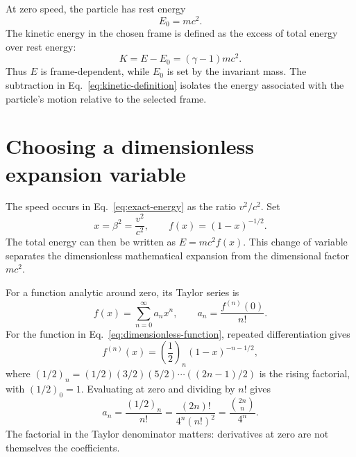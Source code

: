 \documentclass[12pt]{article}
\begin{document}
At zero speed, the particle has rest energy
\begin{equation}
  E_0=mc^2.
  \label{eq:rest-energy}
\end{equation}
The kinetic energy in the chosen frame is defined as the excess of total energy over rest energy:
\begin{equation}
  K=E-E_0=(\gamma-1)mc^2.
  \label{eq:kinetic-definition}
\end{equation}
Thus $E$ is frame-dependent, while $E_0$ is set by the invariant mass. The subtraction in Eq.~\eqref{eq:kinetic-definition} isolates the energy associated with the particle's motion relative to the selected frame.

\section{Choosing a dimensionless expansion variable}

The speed occurs in Eq.~\eqref{eq:exact-energy} as the ratio $v^2/c^2$. Set
\begin{equation}
  x=\beta^2=\frac{v^2}{c^2},
  \qquad
  f(x)=(1-x)^{-1/2}.
  \label{eq:dimensionless-function}
\end{equation}
The total energy can then be written as $E=mc^2f(x)$. This change of variable separates the dimensionless mathematical expansion from the dimensional factor $mc^2$.

For a function analytic around zero, its Taylor series is
\begin{equation}
  f(x)=\sum_{n=0}^{\infty}a_nx^n,
  \qquad
  a_n=\frac{f^{(n)}(0)}{n!}.
  \label{eq:taylor-definition}
\end{equation}
For the function in Eq.~\eqref{eq:dimensionless-function}, repeated differentiation gives
\begin{equation}
  f^{(n)}(x)=\left(\frac{1}{2}\right)_n(1-x)^{-n-1/2},
  \label{eq:binomial-derivative}
\end{equation}
where $(1/2)_n=(1/2)(3/2)(5/2)\cdots((2n-1)/2)$ is the rising factorial, with $(1/2)_0=1$. Evaluating at zero and dividing by $n!$ gives
\begin{equation}
  a_n=\frac{(1/2)_n}{n!}
     =\frac{(2n)!}{4^n(n!)^2}
     =\frac{\binom{2n}{n}}{4^n}.
  \label{eq:general-coefficient}
\end{equation}
The factorial in the Taylor denominator matters: derivatives at zero are not themselves the coefficients.
\end{document}
